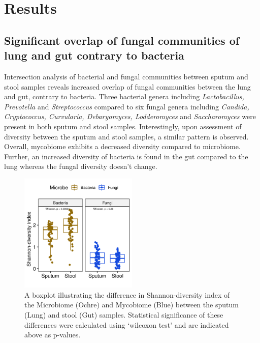 \section{Results}

\subsection{Significant overlap of fungal communities of lung and gut contrary to bacteria}

Intersection analysis of bacterial and fungal communities between sputum and stool samples reveals increased overlap of fungal communities between the lung and gut, contrary to bacteria. Three bacterial genera including \emph{Lactobacillus, Prevotella} and \emph{Streptococcus} compared to six fungal genera including \emph{Candida, Cryptococcus, Curvularia, Debaryomyces, Lodderomyces} and \emph{Saccharomyces} were present in both sputum and stool samples. Interestingly, upon assessment of diversity between the sputum and stool samples, a similar pattern is observed. Overall, mycobiome exhibits a decreased diversity compared to microbiome. Further, an increased diversity of bacteria is found in the gut compared to the lung whereas the fungal diversity doesn't change. 

\begin{figure}[h]
	\centering
	\includegraphics[width=0.5\textwidth]{image/diversity.png}
	\caption{A boxplot illustrating the difference in Shannon-diversity index of the Microbiome (Ochre) and Mycobiome (Blue) between the sputum (Lung) and stool (Gut) samples. Statistical significance of these differences were calculated using `wilcoxon test' and are indicated above as p-values.}
	\label{res2_fig1}
\end{figure}

